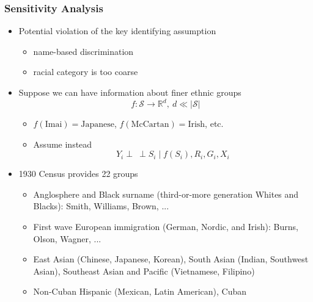 \documentclass[handout]{beamer}
\newcommand{\indep}{\mathbin{\perp\!\!\!\!\!\:\perp}}
\newcommand{\R}{\ensuremath{\mathbb{R}}}
\newcommand{\cS}{\mathcal{S}}
\begin{document}
\begin{frame}

  \frametitle{Sensitivity Analysis}

  \begin{itemize}
  \item Potential violation of the key identifying assumption
    \begin{itemize}
    \item name-based discrimination
    \item racial category is too coarse
    \end{itemize}

  \item Suppose we can have information about finer ethnic groups
    $$f:\cS\to\R^d,\  d\ll|\cS|$$
    \begin{itemize}
    \item $f(\text{Imai}) = \text{Japanese}$,  $f(\text{McCartan}) =
      \text{Irish}$, etc.
    \item Assume instead
      $$Y_i\indep S_i\mid f(S_i),R_i,G_i,X_i$$
    \end{itemize}

  \item 1930 Census provides 22 groups
    \begin{itemize}
    \item Anglosphere and Black surname (third-or-more generation
      Whites and Blacks): Smith, Williams, Brown,
      ...
    \item First wave European immigration (German, Nordic, and Irish): Burns, Olson, Wagner, ...
    \item East Asian (Chinese, Japanese, Korean), South Asian
      (Indian, Southwest Asian),
      Southeast Asian and Pacific (Vietnamese, Filipino)
    \item Non-Cuban Hispanic (Mexican, Latin American), Cuban 
    \end{itemize}
 \end{itemize}


\end{frame}
\end{document}
